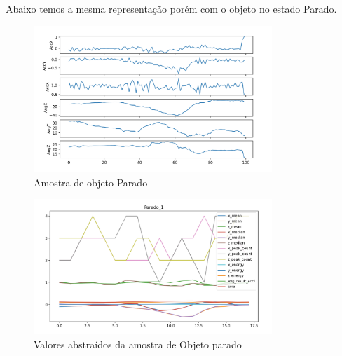 Abaixo temos a mesma representação porém com o objeto no estado Parado.


\begin{figure}[H]
    \center
    \includegraphics[width=9cm]{images/Parado_1_raw.png}
    \caption{Amostra de objeto Parado}
\end{figure}

\begin{figure}[H]
    \center
    \includegraphics[width=9cm]{images/Parado_1_stats.png}
    \caption{ Valores abstraídos da amostra de Objeto parado }
\end{figure}

